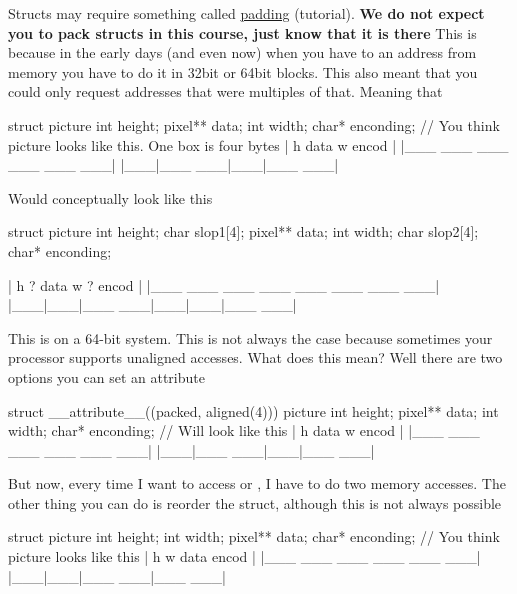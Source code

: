 Structs may require something called \href{http://www.catb.org/esr/structure-packing/}{padding} (tutorial).
\textbf{We do not expect you to pack structs in this course, just know that it
is there} This is because in the early days (and even now) when you have
to an address from memory you have to do it in 32bit or 64bit blocks.
This also meant that you could only request addresses that were
multiples of that. Meaning that

\begin{code}[language=C]
struct picture{
    int height;
    pixel** data;
    int width;
    char* enconding;
}
// You think picture looks like this. One box is four bytes
| h   data    w   encod |
|___ ___ ___ ___ ___ ___|
|___|___ ___|___|___ ___|
\end{code}

Would conceptually look like this

\begin{code}[language=C]
struct picture{
    int height;
    char slop1[4];
    pixel** data;
    int width;
    char slop2[4];
    char* enconding;
}

| h   ?   data    w   ?   encod |
|___ ___ ___ ___ ___ ___ ___ ___|
|___|___|___ ___|___|___|___ ___|
\end{code}

This is on a 64-bit system. This is not always the case because
sometimes your processor supports unaligned accesses. What does this
mean? Well there are two options you can set an attribute

\begin{code}[language=C]
struct __attribute__((packed, aligned(4))) picture{
    int height;
    pixel** data;
    int width;
    char* enconding;
}
// Will look like this
| h   data    w   encod |
|___ ___ ___ ___ ___ ___|
|___|___ ___|___|___ ___|

\end{code}

But now, every time I want to access  or ,
I have to do two memory accesses. The other thing you can do is reorder
the struct, although this is not always possible

\begin{code}[language=C]
struct picture{
    int height;
    int width;
    pixel** data;
    char* enconding;
}
// You think picture looks like this
| h   w    data   encod |
|___ ___ ___ ___ ___ ___|
|___|___|___ ___|___ ___|

\end{code}

